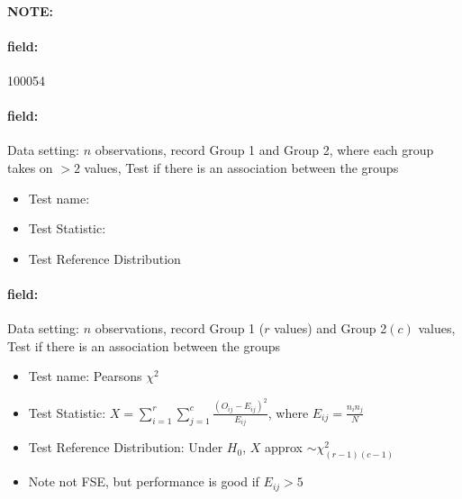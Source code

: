 \documentclass[12pt]{article}
\newenvironment{note}{\paragraph{NOTE:}}{}
\newenvironment{field}{\paragraph{field:}}{}
\begin{document}
\begin{note} \begin{field} \tiny 100054 \end{field}
 \begin{field}
  Data setting: $n$ observations, record Group 1 and Group 2, where each group takes on $> 2$ values, Test if there is an association between the groups
  \begin{itemize}
   \item Test name:
   \item Test Statistic:
   \item Test Reference Distribution
  \end{itemize}
 \end{field}
 \begin{field}
  Data setting: $n$ observations, record Group 1 ($r$ values) and Group 2$(c)$ values, Test if there is an association between the groups
  \begin{itemize}
   \item Test name: Pearsons $\chi^2$
   \item Test Statistic: $X = \sum_{i=1}^r \sum_{j=1}^c \frac{(O_{ij} - E_{ij})^2}{E_{ij}}$, where $E_{ij} = \frac{n_in_j}{N}$
   \item Test Reference Distribution: Under $H_0$, $X$ approx $\sim \chi^2_{(r-1)(c-1)}$
   \item Note not FSE, but performance is good if $E_{ij} > 5$
  \end{itemize}
 \end{field}
\end{note}
\end{document}
